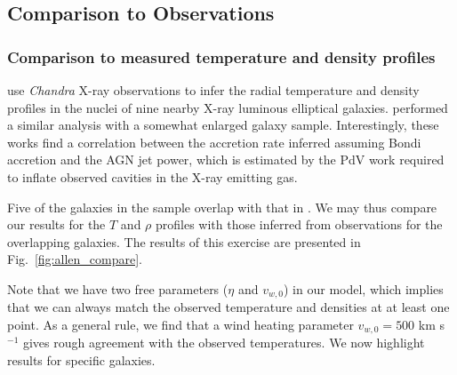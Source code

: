 \documentclass[usenatbib,fleqn]{mn2e}
\newcommand{\vwO}{v_{w,0}}
\begin{document}

\subsection{Comparison to Observations}
\subsubsection{Comparison to measured temperature and density profiles}
\citet{AllenDunn+:2006a} use {\it Chandra} X-ray observations to infer the radial temperature and density profiles in the nuclei of nine nearby X-ray luminous elliptical galaxies.  \citet{RussellMcNamara+:2013a} performed a similar analysis with a somewhat enlarged galaxy sample.  Interestingly, these works find a correlation between the accretion rate inferred assuming Bondi accretion and the AGN jet power, which is estimated by the PdV work required to inflate observed cavities in the X-ray emitting gas.  

Five of the galaxies in the \citet{AllenDunn+:2006a} sample overlap with that in .  We may thus compare our results for the $T$ and $\rho$ profiles with those inferred from observations for the overlapping galaxies.  The results of this exercise are presented in Fig.~\ref{fig:allen_compare}.

Note that we have two free parameters ($\eta$ and $\vwO$) in our
model, which implies that we can always match the observed temperature
and densities at at least one point.  As a general rule, we find that
a wind heating parameter $\vwO=500$ km s$^{-1}$ gives rough agreement
with the observed temperatures.  We now highlight results for specific
galaxies.
\end{document}
